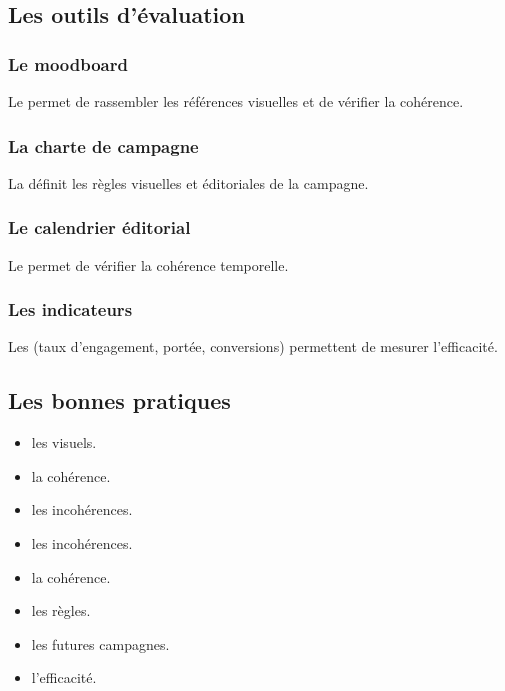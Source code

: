 \subsection{Les outils d'évaluation}

\subsubsection{Le moodboard}

Le  permet de rassembler les références visuelles et de vérifier la cohérence.

\subsubsection{La charte de campagne}

La  définit les règles visuelles et éditoriales de la campagne.

\subsubsection{Le calendrier éditorial}

Le  permet de vérifier la cohérence temporelle.

\subsubsection{Les indicateurs}

Les  (taux d'engagement, portée, conversions) permettent de mesurer l'efficacité.

\subsection{Les bonnes pratiques}

\begin{itemize}
    \item {} les visuels.
    \item {} la cohérence.
    \item {} les incohérences.
    \item {} les incohérences.
    \item {} la cohérence.
    \item {} les règles.
    \item {} les futures campagnes.
    \item {} l'efficacité.
\end{itemize}

